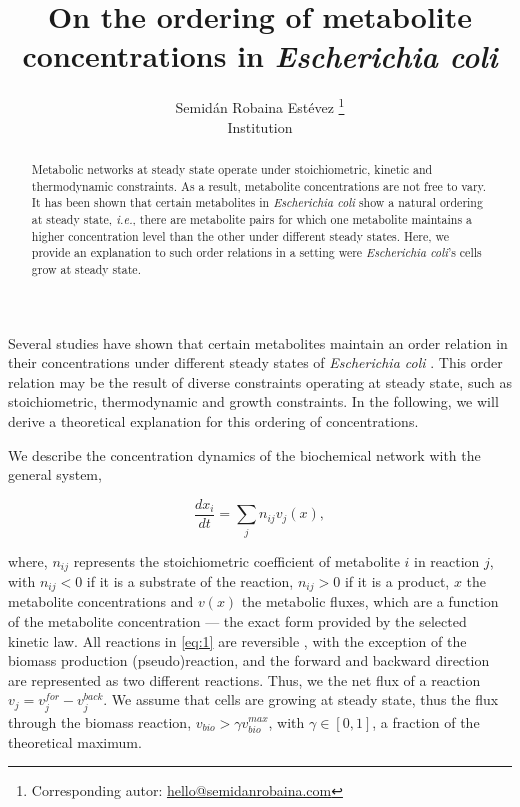 \documentclass[12pt]{article}
\title{On the ordering of metabolite concentrations in \emph{Escherichia coli}}
\author{Semid\'an Robaina Est\'evez \footnote{Corresponding autor: \href{mailto:hello@semidanrobaina.com}{hello@semidanrobaina.com}}\\Institution}
\date{\vspace{-5ex}}
\newcommand{\note}[2][]{\added[#1,remark={#2}]{}}
\begin{document}
  \maketitle
  

  \begin{abstract}
    Metabolic networks at steady state operate under stoichiometric, kinetic and thermodynamic constraints. As a result, metabolite concentrations are not free to vary. It has been shown that certain metabolites in \emph{Escherichia coli} show a natural ordering at steady state, \emph{i.e.}, there are metabolite pairs for which one metabolite maintains a higher concentration level than the other under different steady states. Here, we provide an explanation to such order relations in a setting were \emph{Escherichia coli}'s cells grow at steady state.
  \end{abstract}


  Several studies have shown that certain metabolites maintain an order relation in their concentrations under different steady states of \emph{Escherichia coli} \cite{Bennett2008,Bennett2009a}. This order relation may be the result of diverse constraints operating at steady state, such as stoichiometric, thermodynamic and growth constraints. In the following, we will derive a theoretical explanation for this ordering of concentrations.

  We describe the concentration dynamics of the biochemical network with the general system,

  \begin{equation}
    \label{eq:1}
    \frac{dx_i}{dt} = \sum_j n_{ij} v_j(x),
  \end{equation}

  \noindent where, $n_{ij}$ represents the stoichiometric coefficient of metabolite $i$ in reaction $j$, with $n_{ij} < 0$ if it is a substrate of the reaction, $n_{ij} > 0$ if it is a product, $x$ the metabolite concentrations and $v(x)$ the metabolic fluxes, which are a function of the metabolite concentration --- the exact form provided by the selected kinetic law. All reactions in \ref{eq:1} are reversible \note[id=SRE]{Might as well include pre-defined irreversible reactions}, with the exception of the biomass production (pseudo)reaction, and the forward and backward direction are represented as two different reactions. Thus, we the net flux of a reaction $v_j = v_j^{for} - v_j^{back}$. We assume that cells are growing at steady state, thus the flux through the biomass reaction, $v_{bio} > \gamma v^{max}_{bio}$, with $\gamma \in [0, 1]$, a fraction of the theoretical maximum. \note[id=SRE]{I'll make a proper intro after I get results. Starting with the second law more appropriate}
\end{document}
